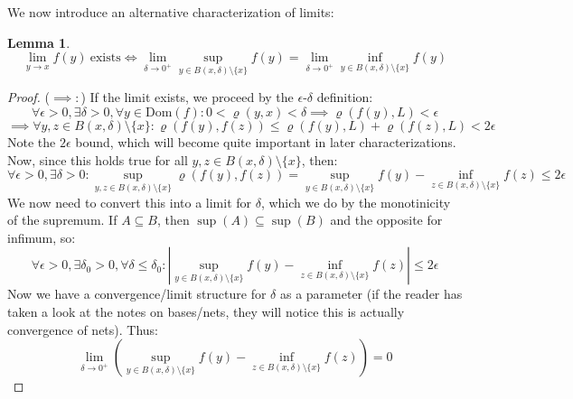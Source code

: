 \documentclass[10pt,letterpaper]{article} %
\newtheorem{lem}{Lemma}[section]
\begin{document}
We now introduce an alternative characterization of limits:
\begin{lem}
\begin{equation*}
\lim_{y \xrightarrow{} x}f(y) \ \text{exists} \iff \lim_{\delta \xrightarrow{} 0^+}\sup_{y \in B(x, \delta) \setminus \{x\}}f(y) = \lim_{\delta \xrightarrow{} 0^+}\inf_{y \in B(x, \delta)\setminus\{x\}}f(y)
\end{equation*}
\end{lem}
\begin{proof}
($\implies:$) If the limit exists, we proceed by the $\epsilon$-$\delta$ definition:
\begin{equation*}
\forall \epsilon > 0, \exists \delta > 0, \forall y \in \text{Dom}(f): 0 < \varrho(y, x) < \delta \implies \varrho(f(y), L) < \epsilon
\end{equation*}
\begin{equation*}
\implies \forall y, z \in B(x, \delta) \setminus \{x\}: \varrho(f(y), f(z)) \leqslant \varrho(f(y), L) + \varrho(f(z), L) < 2\epsilon
\end{equation*}
Note the $2\epsilon$ bound, which will become quite important in later characterizations. Now, since this holds true for all $y, z \in B(x, \delta)\setminus \{x\}$, then:
\begin{equation*}
\forall \epsilon > 0, \exists \delta > 0: \sup_{y, z \in B(x, \delta) \setminus \{x\}}\varrho(f(y), f(z)) = \sup_{y \in B(x, \delta)\setminus\{x\}}f(y) - \inf_{z \in B(x, \delta)\setminus\{x\}}f(z) \leqslant 2\epsilon
\end{equation*}
We now need to convert this into a limit for $\delta$, which we do by the monotinicity of the supremum. If $A \subseteq B$, then $\sup(A) \subseteq \sup(B)$ and the opposite for infimum, so:
\begin{equation*}
\forall \epsilon > 0, \exists \delta_0 > 0, \forall \delta \leqslant \delta_0: \left|\sup_{y \in B(x, \delta)\setminus\{x\}}f(y) - \inf_{z \in B(x, \delta)\setminus\{x\}}f(z)\right| \leqslant 2\epsilon
\end{equation*}
Now we have a convergence/limit structure for $\delta$ as a parameter (if the reader has taken a look at the notes on bases/nets, they will notice this is actually convergence of nets). Thus:
\begin{equation*}
  \lim_{\delta \xrightarrow{} 0^+}\left(\sup_{y \in B(x, \delta)\setminus \{x\}}f(y) - \inf_{z \in B(x, \delta) \setminus \{x\}}f(z)\right) = 0
\end{equation*}
\begin{equation*}

\end{equation*}
\end{proof}
\end{document}
